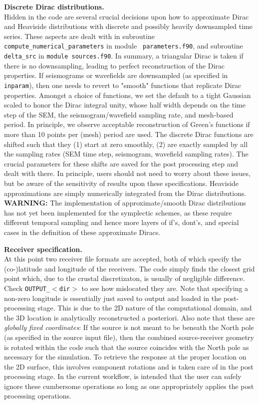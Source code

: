 \documentclass[11pt,letter,fleqn,english,notitlepage]{article}
\begin{document}
\noindent \textbf{Discrete Dirac distributions.}\\
Hidden in the code are several crucial decisions upon how to
approximate Dirac and Heaviside distributions with discrete and
possibly heavily downsampled time series. These aspects are dealt with
in subroutine {\tt compute\_numerical\_parameters} in module {\tt
  parameters.f90}, and subroutine {\tt delta\_src} in {\tt module
  sources.f90}.
In summary, a triangular Dirac is taken if there is no downsampling,
leading to perfect reconstruction of the Dirac properties. If
seismograms or wavefields are downsampled (as specified in {\tt
  inparam}), then one needs to revert to "smooth" functions that
replicate Dirac properties. Amongst a choice of functions, 
we set the default to a tight Gaussian scaled to honor the Dirac
integral unity,
whose half width depends on the time step of the SEM, the
seismogram/wavefield sampling rate, and mesh-based period. In
principle, we observe acceptable reconstruction of Green's functions 
if more than 10 points per (mesh) period are used. The discrete Dirac
functions are shifted such that they (1) start at zero smoothly, (2)
are exactly sampled by all the sampling rates (SEM time step,
seismogram, wavefield sampling rates). The crucial parameters for
these shifts are saved for the post processing step and dealt with
there. In principle, users should not need to worry about these
issues, but be aware of the sensitivity of results upon these
specifications. Heaviside approximations are simply numerically
integrated from the Dirac distributions.\\

\textbf{WARNING:} The implementation of approximate/smooth Dirac
distributions has not yet been implemented for the symplectic schemes,
as these require different temporal sampling and hence more layers of
if's, dont's, and special cases in the definition of these approximate Diracs.

\noindent \textbf{Receiver specification.}\\
At this point two receiver file formats are accepted, both of which specify the (co-)latitude and longitude of the
receivers. The code simply finds the closest grid point which, due to the
crustal discretizaton, is usually of negligible difference. Check {\tt OUTPUT\_$<$dir$>$} to see how mislocated they are.
Note that specifying a non-zero longitude is essentially just saved to output and loaded in the 
post-processing stage. This is due to the 2D nature of the computational domain, and the 3D location is analytically reconstructed 
a posteriori. Also note that these are \textit{globally fixed coordinates}: If the source is not meant to be beneath the North pole 
(as specified in the source input file), then the combined source-receiver geometry is rotated within the code such that the source 
coincides with the North pole as necessary for the simulation. 
To retrieve the response at the proper location on the 2D surface, 
this involves component rotations and is taken care of in the post processing stage. In the current 
workflow, is intended that the user can safely ignore these cumbersome operations so long as one appropriately applies 
the post processing operations. \\
\end{document}
